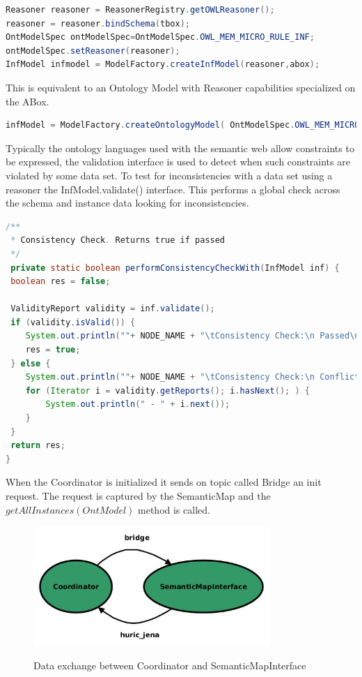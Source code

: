\begin{lstlisting}[language=Java]
Reasoner reasoner = ReasonerRegistry.getOWLReasoner();
reasoner = reasoner.bindSchema(tbox);
OntModelSpec ontModelSpec=OntModelSpec.OWL_MEM_MICRO_RULE_INF;
ontModelSpec.setReasoner(reasoner);
InfModel infmodel = ModelFactory.createInfModel(reasoner,abox);
\end{lstlisting}
This is equivalent to an Ontology Model with Reasoner capabilities
specialized on the ABox.
\begin{lstlisting}[language=Java]
infModel = ModelFactory.createOntologyModel( OntModelSpec.OWL_MEM_MICRO_RULE_INF, abox);
\end{lstlisting}

Typically the ontology languages used with the semantic web allow constraints to be expressed, the validation interface is used to detect when such constraints are violated by some data set. To test for inconsistencies with a data set using a reasoner the InfModel.validate() interface. This performs a global check across the schema and instance data looking for inconsistencies. 


\begin{lstlisting}[language=Java]
/** 
 * Consistency Check. Returns true if passed
 */
 private static boolean performConsistencyCheckWith(InfModel inf) {
 boolean res = false; 

 ValidityReport validity = inf.validate();
 if (validity.isValid()) {
	System.out.println(""+ NODE_NAME + "\tConsistency Check:\n Passed\n");
	res = true;
 } else {
	System.out.println(""+ NODE_NAME + "\tConsistency Check:\n Conflicts\n");
	for (Iterator i = validity.getReports(); i.hasNext(); ) {
	    System.out.println(" - " + i.next());
	}
 }
 return res;
}
\end{lstlisting}

When the Coordinator is initialized it sends on topic called Bridge an init request. The request is captured by the SemanticMap and the $getAllInstances(OntModel)$ method is called. 


\begin{figure}[H]
\centering
\includegraphics[width=0.8\textwidth]{imgs/topics1.jpg}
\label{fig:actions}
\caption{Data exchange between Coordinator and SemanticMapInterface}
\end{figure}


